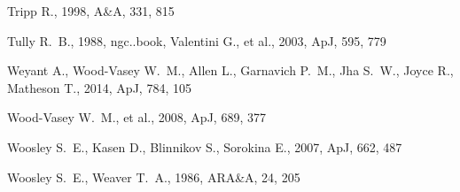 \begin{thebibliography}{99}
 Tripp R., 1998, A\&A, 331, 815 

 Tully 
R.~B., 1988, ngc..book,
 Valentini G., et al., 2003, ApJ, 595,
779 

Weyant A., Wood-Vasey W.~M., Allen L., Garnavich P.~M., Jha S.~W., Joyce 
R., Matheson T., 2014, ApJ, 784, 105 



 Wood-Vasey W.~M., et al., 2008, ApJ, 689, 
377 

 Woosley S.~E., Kasen D., Blinnikov S., 
Sorokina E., 2007, ApJ, 662, 487 

 Woosley S.~E., Weaver T.~A., 1986, ARA\&A, 24, 205 

\end{thebibliography}
